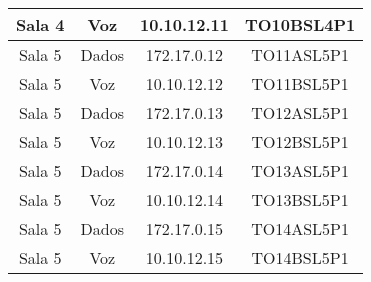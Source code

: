 \begin{table}[]
\begin{tabular}{cccc}
		Sala 4          & Voz              & 10.10.12.11 & TO10BSL4P1          \\ \hline
		Sala 5          & Dados            & 172.17.0.12 & TO11ASL5P1           \\ \hline
		Sala 5          & Voz              & 10.10.12.12 & TO11BSL5P1           \\ \hline
		Sala 5          & Dados            & 172.17.0.13 & TO12ASL5P1           \\ \hline
		Sala 5          & Voz              & 10.10.12.13 & TO12BSL5P1           \\ \hline
		Sala 5          & Dados            & 172.17.0.14 & TO13ASL5P1           \\ \hline
		Sala 5          & Voz              & 10.10.12.14 & TO13BSL5P1           \\ \hline
		Sala 5          & Dados            & 172.17.0.15 & TO14ASL5P1           \\ \hline
		Sala 5          & Voz              & 10.10.12.15 & TO14BSL5P1           \\ \hline
	\end{tabular}
\end{table}